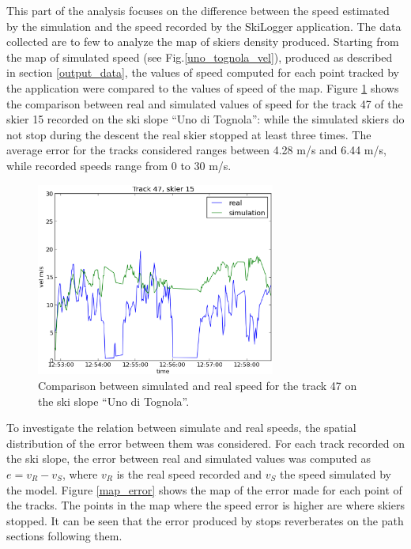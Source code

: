\documentclass[12pt,a4paper,twoside]{book}
\begin{document}
This part of the analysis focuses on the difference between the speed estimated by the simulation and the speed recorded by the SkiLogger application. The data collected are to few to analyze the map of skiers density produced. Starting from the map of simulated speed (see Fig.\ref{uno_tognola_vel}), produced as described in section \ref{output_data}, the values of speed computed for each point tracked by the application were compared to the values of speed of the map. Figure \ref{sm_track47} shows the comparison between real and simulated values of speed for the track 47 of the skier 15 recorded on the ski slope ``Uno di Tognola'': while the simulated skiers do not stop during the descent the real skier stopped at least three times. The average error for the tracks considered ranges between 4.28 m/s and 6.44 m/s, while recorded speeds range from 0 to 30 m/s.

\begin{figure}
  \begin{center}
    \includegraphics[width=0.7\textwidth]{images/sm_track47.eps}
    \caption{Comparison between simulated and real speed for the track 47 on the ski slope ``Uno di Tognola''.}\label{sm_track47}
  \end{center}
\end{figure}

To investigate the relation between simulate and real speeds, the spatial distribution of the error between them was considered. For each track recorded on the ski slope, the error between real and simulated values was computed as $e=v_R-v_S$, where $v_R$ is the real speed recorded and $v_S$ the speed simulated by the model. Figure \ref{map_error} shows the map of the error made for each point of the tracks. The points in the map where the speed error is higher are where skiers stopped. It can be seen that the error produced by stops reverberates on the path sections following them.
\end{document}
